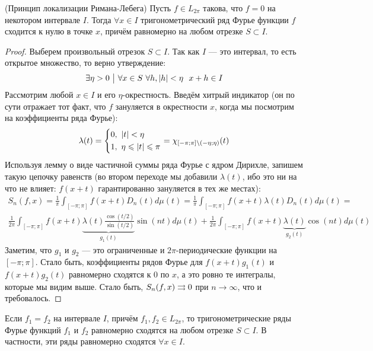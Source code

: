 \begin{theorem} (Принцип локализации Римана-Лебега)
	Пусть $f \in L_{2\pi}$ такова, что $f = 0$ на некотором интервале $I$. Тогда $\forall x \in I$ тригонометрический ряд Фурье функции $f$ сходится к нулю в точке $x$, причём равномерно на любом отрезке $S \subset I$.
\end{theorem}

\begin{proof}
	Выберем произвольный отрезок $S \subset I$. Так как $I$ --- это интервал, то есть открытое множество, то верно утверждение:
	\[
		\exists \eta > 0 \such \forall x \in S\ \forall h, |h| < \eta\ \ x + h \in I
	\]
	Рассмотрим любой $x \in I$ и его $\eta$-окрестность. Введём хитрый индикатор (он по сути отражает тот факт, что $f$ зануляется в окрестности $x$, когда мы посмотрим на коэффициенты ряда Фурье):
	\[
		\lambda(t) = \left\{ \begin{aligned} 
			&{0,\ |t| < \eta}
			\\
			&{1,\ \eta \leqslant |t| \leqslant \pi}
		 \end{aligned} \right.
		= \chi_{[-\pi; \pi] \backslash (-\eta; \eta)}(t)
	\]
	Используя лемму о виде частичной суммы ряда Фурье с ядром Дирихле, запишем такую цепочку равенств (во втором переходе мы добавили $\lambda(t)$, ибо это ни на что не влияет: $f(x + t)$ гарантированно зануляется в тех же местах):
	\begin{multline*}
		S_n(f, x) = \frac{1}{\pi} \int_{[-\pi; \pi]} f(x + t)D_n(t)d\mu(t) = \frac{1}{\pi} \int_{[-\pi; \pi]} f(x + t)\lambda(t)D_n(t)d\mu(t) =
		\\
		\frac{1}{2\pi} \int_{[-\pi; \pi]} f(x + t)\underbrace{\lambda(t) \frac{\cos(t / 2)}{\sin(t / 2)}}_{g_1(t)}\sin(nt)d\mu(t) + \frac{1}{2\pi} \int_{[-\pi; \pi]} f(x + t)\underbrace{\lambda(t)}_{g_2(t)}\cos(nt)d\mu(t)
	\end{multline*}
	Заметим, что $g_1$ и $g_2$ --- это ограниченные и $2\pi$-периодические функции на $[-\pi; \pi]$. Стало быть, коэффициенты рядов Фурье для $f(x + t)g_1(t)$ и $f(x + t)g_2(t)$ равномерно сходятся к 0 по $x$, а это ровно те интегралы, которые мы видим выше. Стало быть, $S_n(f, x) \rightrightarrows 0$ при $n \to \infty$, что и требовалось.
\end{proof}

\begin{corollary}
	Если $f_1 = f_2$ на интервале $I$, причём $f_1, f_2 \in L_{2\pi}$, то тригонометрические ряды Фурье функций $f_1$ и $f_2$ равномерно сходятся на любом отрезке $S \subset I$. В частности, эти ряды равномерно сходятся $\forall x \in I$.
\end{corollary}

